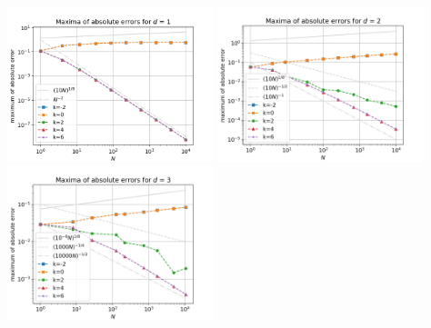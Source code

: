 \documentclass{scrartcl}
\begin{document}
{
  \centering
    \includegraphics[width=0.45\textwidth]{Grafiken/epsilon_d1}
    \includegraphics[width=0.45\textwidth]{Grafiken/epsilon_d2}
    \includegraphics[width=0.45\textwidth]{Grafiken/epsilon_d3}
    \vspace{-0.2cm}
}
\vspace{0.5cm}


\pagebreak
\end{document}
